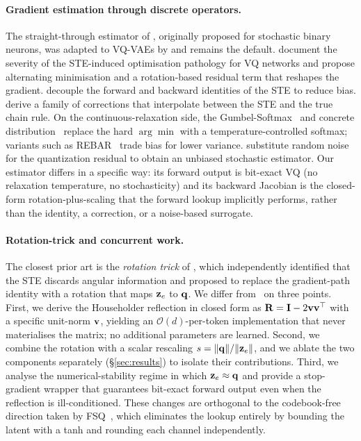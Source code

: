 \paragraph{Gradient estimation through discrete operators.}
The straight-through estimator of \citet{bengio2013ste}, originally
proposed for stochastic binary neurons, was adapted to VQ-VAEs by
\citet{vandenoord2017vqvae} and remains the default.
\citet{huh2023straighteningste} document the severity of the
STE-induced optimisation pathology for VQ networks and propose
alternating minimisation and a rotation-based residual term that
reshapes the gradient.
\citet{shah2024decoupledste} decouple the forward and backward
identities of the STE to reduce bias.
\citet{liu2023discretebackprop} derive a family of corrections that
interpolate between the STE and the true chain rule. On the
continuous-relaxation side, the
Gumbel-Softmax~\citep{jang2017gumbel} and concrete
distribution~\citep{maddison2017concrete} replace the hard
$\arg\min$ with a temperature-controlled softmax; variants such as
REBAR~\citep[and follow-ups]{jang2017gumbel} trade bias for lower
variance. \citet{vali2022nsvq} substitute random noise for the
quantization residual to obtain an unbiased stochastic estimator.
Our estimator differs in a specific way: its forward output is
bit-exact VQ (no relaxation temperature, no stochasticity) and its
backward Jacobian is the closed-form rotation-plus-scaling that the
forward lookup implicitly performs, rather than the identity, a
correction, or a noise-based surrogate.

\paragraph{Rotation-trick and concurrent work.}
The closest prior art is the \emph{rotation trick} of
\citet{fifty2024rotation}, which independently identified that the
STE discards angular information and proposed to replace the
gradient-path identity with a rotation that maps $\mathbf{z}_e$ to $\mathbf{q}$.
We differ from~\citet{fifty2024rotation} on three points. First, we
derive the Householder reflection in closed form as
$\mathbf{R} = \mathbf{I} - 2\mathbf{v}\mathbf{v}^\top$ with a specific
unit-norm $\mathbf{v}$, yielding an $\mathcal{O}(d)$-per-token
implementation that never materialises the matrix; no additional
parameters are learned. Second, we combine the rotation with a scalar
rescaling $s = \|\mathbf{q}\|/\|\mathbf{z}_e\|$, and we ablate the two components
separately (\S\ref{sec:results}) to isolate their contributions.
Third, we analyse the numerical-stability regime in which
$\mathbf{z}_e \approx \mathbf{q}$ and provide a stop-gradient wrapper that
guarantees bit-exact forward output even when the reflection is
ill-conditioned. These changes are orthogonal to the codebook-free
direction taken by FSQ~\citep{mentzer2024fsq}, which eliminates the
lookup entirely by bounding the latent with a tanh and rounding each
channel independently.


